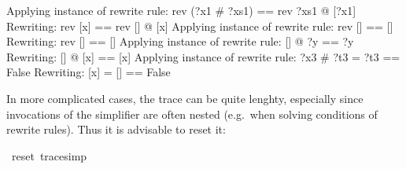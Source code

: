 \begin{isabellebody}
\begin{isamarkuptext}
\begin{ttbox}\makeatother
Applying instance of rewrite rule:
rev (?x1 \# ?xs1) == rev ?xs1 @ [?x1]
Rewriting:
rev [x] == rev [] @ [x]
Applying instance of rewrite rule:
rev [] == []
Rewriting:
rev [] == []
Applying instance of rewrite rule:
[] @ ?y == ?y
Rewriting:
[] @ [x] == [x]
Applying instance of rewrite rule:
?x3 \# ?t3 = ?t3 == False
Rewriting:
[x] = [] == False
\end{ttbox}

In more complicated cases, the trace can be quite lenghty, especially since
invocations of the simplifier are often nested (e.g.\ when solving conditions
of rewrite rules). Thus it is advisable to reset it:%
\end{isamarkuptext}%
\ {\isachardoublequote}reset\ trace{\isacharunderscore}simp{\isachardoublequote}\isanewline
\end{isabellebody}%

